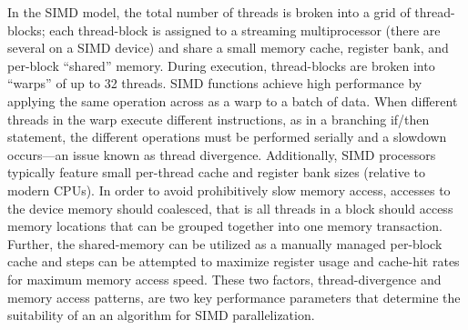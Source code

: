 \documentclass[preprint,12pt]{elsarticle}
\begin{document}
In the SIMD model, the total number of threads is broken into a grid of thread-blocks; each thread-block is assigned to a streaming multiprocessor (there are several on a SIMD device) and share a small memory cache, register bank, and per-block ``shared'' memory.
During execution, thread-blocks are broken into ``warps'' of up to 32 threads.
SIMD functions achieve high performance by applying the same operation across as a warp to a batch of data.
When different threads in the warp execute different instructions, as in a branching if\slash then statement, the different operations must be performed serially and a slowdown occurs---an issue known as thread divergence.
Additionally, SIMD processors typically feature small per-thread cache and register bank sizes (relative to modern CPUs).
In order to avoid prohibitively slow memory access, accesses to the device memory should coalesced, that is all threads in a block should access memory locations that can be grouped together into one memory transaction.
Further, the shared-memory can be utilized as a manually managed per-block cache and steps can be attempted to maximize register usage and cache-hit rates for maximum memory access speed.
These two factors, thread-divergence and memory access patterns, are two key performance parameters that determine the suitability of an an algorithm for SIMD parallelization.
\end{document}
